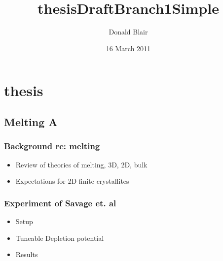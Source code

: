 \documentclass[11pt]{article}
\title{thesisDraftBranch1Simple}
\author{Donald Blair}
\date{16 March 2011}
\begin{document}
\maketitle

\setcounter{tocdepth}{3}
\tableofcontents
\vspace*{1cm}
\section{thesis}
\label{sec-1}
\subsection{Melting A}
\label{sec-1_1}
\subsubsection{Background re: melting}
\label{sec-1_1_1}
\begin{itemize}

\item Review of theories of melting, 3D, 2D, bulk\\
\label{sec-1_1_1_1}%
\item Expectations for 2D finite crystallites\\
\label{sec-1_1_1_2}%
\end{itemize} %
\subsubsection{Experiment of Savage et. al}
\label{sec-1_1_2}
\begin{itemize}

\item Setup\\
\label{sec-1_1_2_1}%
\item Tuneable Depletion potential\\
\label{sec-1_1_2_2}%
\item Results\\
\label{sec-1_1_2_3}%
\end{itemize} %
\end{document}
